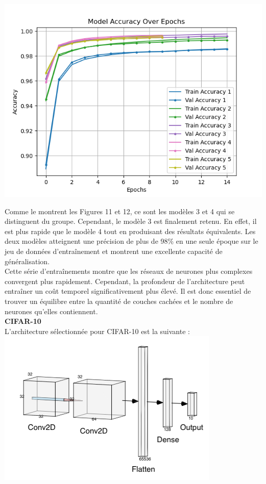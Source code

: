 \begin{multicols}{2}
\includegraphics[width=\columnwidth]{images/mnist_accuracies.png}
\hfill\break

Comme le montrent les Figures 11 et 12, ce sont les modèles 3 et 4 qui se distinguent du groupe. 
Cependant, le modèle 3 est finalement retenu. En effet, il est plus rapide que le modèle 4 tout en 
produisant des résultats équivalents. Les deux modèles atteignent une précision de plus de 98\% 
en une seule époque sur le jeu de données d’entraînement et montrent une excellente capacité de généralisation. \\

Cette série d’entraînements montre que les réseaux de neurones plus complexes convergent plus 
rapidement. Cependant, la profondeur de l’architecture peut entraîner un coût temporel significativement 
plus élevé. Il est donc essentiel de trouver un équilibre entre la quantité de couches cachées et le 
nombre de neurones qu’elles contiennent. \\

\textbf{CIFAR-10} \\

L'architecture sélectionnée pour CIFAR-10 est la suivante : \\

\includegraphics[width=\columnwidth]{images/cifar10_nn.png}
\hfill\break


\end{multicols}

